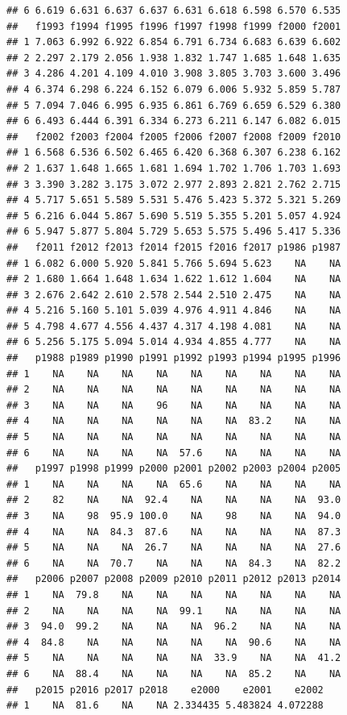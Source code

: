 \documentclass[
]{book}
\begin{document}
\begin{verbatim}
## 6 6.619 6.631 6.637 6.637 6.631 6.618 6.598 6.570 6.535
##   f1993 f1994 f1995 f1996 f1997 f1998 f1999 f2000 f2001
## 1 7.063 6.992 6.922 6.854 6.791 6.734 6.683 6.639 6.602
## 2 2.297 2.179 2.056 1.938 1.832 1.747 1.685 1.648 1.635
## 3 4.286 4.201 4.109 4.010 3.908 3.805 3.703 3.600 3.496
## 4 6.374 6.298 6.224 6.152 6.079 6.006 5.932 5.859 5.787
## 5 7.094 7.046 6.995 6.935 6.861 6.769 6.659 6.529 6.380
## 6 6.493 6.444 6.391 6.334 6.273 6.211 6.147 6.082 6.015
##   f2002 f2003 f2004 f2005 f2006 f2007 f2008 f2009 f2010
## 1 6.568 6.536 6.502 6.465 6.420 6.368 6.307 6.238 6.162
## 2 1.637 1.648 1.665 1.681 1.694 1.702 1.706 1.703 1.693
## 3 3.390 3.282 3.175 3.072 2.977 2.893 2.821 2.762 2.715
## 4 5.717 5.651 5.589 5.531 5.476 5.423 5.372 5.321 5.269
## 5 6.216 6.044 5.867 5.690 5.519 5.355 5.201 5.057 4.924
## 6 5.947 5.877 5.804 5.729 5.653 5.575 5.496 5.417 5.336
##   f2011 f2012 f2013 f2014 f2015 f2016 f2017 p1986 p1987
## 1 6.082 6.000 5.920 5.841 5.766 5.694 5.623    NA    NA
## 2 1.680 1.664 1.648 1.634 1.622 1.612 1.604    NA    NA
## 3 2.676 2.642 2.610 2.578 2.544 2.510 2.475    NA    NA
## 4 5.216 5.160 5.101 5.039 4.976 4.911 4.846    NA    NA
## 5 4.798 4.677 4.556 4.437 4.317 4.198 4.081    NA    NA
## 6 5.256 5.175 5.094 5.014 4.934 4.855 4.777    NA    NA
##   p1988 p1989 p1990 p1991 p1992 p1993 p1994 p1995 p1996
## 1    NA    NA    NA    NA    NA    NA    NA    NA    NA
## 2    NA    NA    NA    NA    NA    NA    NA    NA    NA
## 3    NA    NA    NA    96    NA    NA    NA    NA    NA
## 4    NA    NA    NA    NA    NA    NA  83.2    NA    NA
## 5    NA    NA    NA    NA    NA    NA    NA    NA    NA
## 6    NA    NA    NA    NA  57.6    NA    NA    NA    NA
##   p1997 p1998 p1999 p2000 p2001 p2002 p2003 p2004 p2005
## 1    NA    NA    NA    NA  65.6    NA    NA    NA    NA
## 2    82    NA    NA  92.4    NA    NA    NA    NA  93.0
## 3    NA    98  95.9 100.0    NA    98    NA    NA  94.0
## 4    NA    NA  84.3  87.6    NA    NA    NA    NA  87.3
## 5    NA    NA    NA  26.7    NA    NA    NA    NA  27.6
## 6    NA    NA  70.7    NA    NA    NA  84.3    NA  82.2
##   p2006 p2007 p2008 p2009 p2010 p2011 p2012 p2013 p2014
## 1    NA  79.8    NA    NA    NA    NA    NA    NA    NA
## 2    NA    NA    NA    NA  99.1    NA    NA    NA    NA
## 3  94.0  99.2    NA    NA    NA  96.2    NA    NA    NA
## 4  84.8    NA    NA    NA    NA    NA  90.6    NA    NA
## 5    NA    NA    NA    NA    NA  33.9    NA    NA  41.2
## 6    NA  88.4    NA    NA    NA    NA  85.2    NA    NA
##   p2015 p2016 p2017 p2018    e2000    e2001    e2002
## 1    NA  81.6    NA    NA 2.334435 5.483824 4.072288

\end{verbatim}
\end{document}
